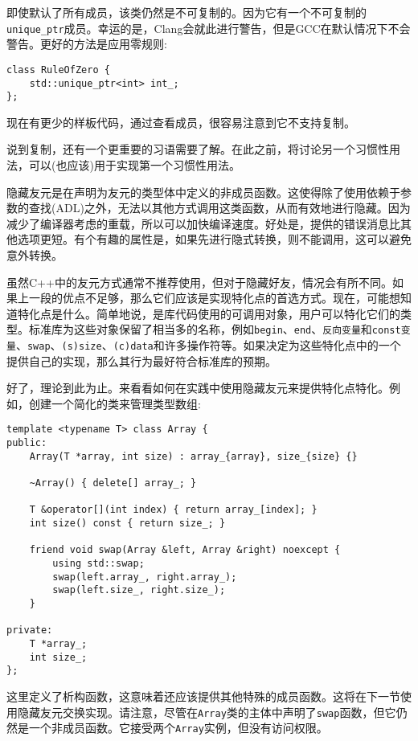 即使默认了所有成员，该类仍然是不可复制的。因为它有一个不可复制的\texttt{unique\_ptr}成员。幸运的是，Clang会就此进行警告，但是GCC在默认情况下不会警告。更好的方法是应用零规则:

\begin{lstlisting}[style=styleCXX]
class RuleOfZero {
	std::unique_ptr<int> int_;
};
\end{lstlisting}

现在有更少的样板代码，通过查看成员，很容易注意到它不支持复制。

说到复制，还有一个更重要的习语需要了解。在此之前，将讨论另一个习惯性用法，可以(也应该)用于实现第一个习惯性用法。


隐藏友元是在声明为友元的类型体中定义的非成员函数。这使得除了使用依赖于参数的查找(ADL)之外，无法以其他方式调用这类函数，从而有效地进行隐藏。因为减少了编译器考虑的重载，所以可以加快编译速度。好处是，提供的错误消息比其他选项更短。有个有趣的属性是，如果先进行隐式转换，则不能调用，这可以避免意外转换。

虽然C++中的友元方式通常不推荐使用，但对于隐藏好友，情况会有所不同。如果上一段的优点不足够，那么它们应该是实现特化点的首选方式。现在，可能想知道特化点是什么。简单地说，是库代码使用的可调用对象，用户可以特化它们的类型。标准库为这些对象保留了相当多的名称，例如\texttt{begin}、\texttt{end}、\texttt{反向变量}和\texttt{const变量}、\texttt{swap}、\texttt{(s)size}、\texttt{(c)data}和许多操作符等。如果决定为这些特化点中的一个提供自己的实现，那么其行为最好符合标准库的预期。

好了，理论到此为止。来看看如何在实践中使用隐藏友元来提供特化点特化。例如，创建一个简化的类来管理类型数组:

\begin{lstlisting}[style=styleCXX]
template <typename T> class Array {
public:
	Array(T *array, int size) : array_{array}, size_{size} {}
	
	~Array() { delete[] array_; }
	
	T &operator[](int index) { return array_[index]; }
	int size() const { return size_; }
	
	friend void swap(Array &left, Array &right) noexcept {
		using std::swap;
		swap(left.array_, right.array_);
		swap(left.size_, right.size_);
	}

private:
	T *array_;
	int size_;
};
\end{lstlisting}

这里定义了析构函数，这意味着还应该提供其他特殊的成员函数。这将在下一节使用隐藏友元交换实现。请注意，尽管在\texttt{Array}类的主体中声明了\texttt{swap}函数，但它仍然是一个非成员函数。它接受两个\texttt{Array}实例，但没有访问权限。

